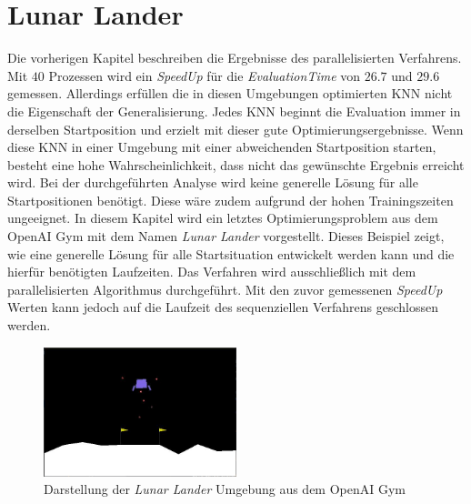 \section{Lunar Lander}
\label{sec:lunar_lander}
Die vorherigen Kapitel beschreiben die Ergebnisse des parallelisierten Verfahrens. Mit $40$ Prozessen wird ein \emph{SpeedUp} für die \emph{EvaluationTime} von $26.7$ und $29.6$ gemessen. Allerdings erfüllen die in diesen Umgebungen optimierten \ac{KNN} nicht die Eigenschaft der Generalisierung. Jedes \ac{KNN} beginnt die Evaluation immer in derselben Startposition und erzielt mit dieser gute Optimierungsergebnisse. Wenn diese \ac{KNN} in einer Umgebung mit einer abweichenden Startposition starten, besteht eine hohe Wahrscheinlichkeit, dass nicht das gewünschte Ergebnis erreicht wird. Bei der durchgeführten Analyse wird keine generelle Lösung für alle Startpositionen benötigt. Diese wäre zudem aufgrund der hohen Trainingszeiten ungeeignet. In diesem Kapitel wird ein letztes Optimierungsproblem aus dem OpenAI Gym mit dem Namen \emph{Lunar Lander} vorgestellt. Dieses Beispiel zeigt, wie eine generelle Lösung für alle Startsituation entwickelt werden kann und die hierfür benötigten Laufzeiten. 
Das Verfahren wird ausschließlich mit dem parallelisierten Algorithmus durchgeführt. Mit den zuvor gemessenen \emph{SpeedUp} Werten kann jedoch auf die Laufzeit des sequenziellen Verfahrens geschlossen werden.
\begin{figure}[!h]
	\centering
	\includegraphics[width=0.5\textwidth]{./img/lunar_lander_env.JPG} 
	\caption{Darstellung der \emph{Lunar Lander} Umgebung aus dem OpenAI Gym}
	\label{fig:lunar_lander_env}
\end{figure} 
\\\\
